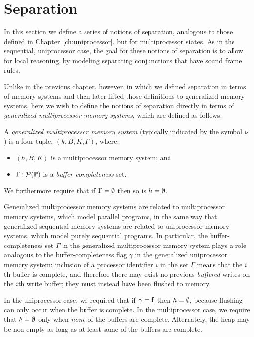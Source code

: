 \documentclass[11pt]{report}         %
\begin{document}
\section{Separation}
\label{sec:separation}

In this section we define a series of notions of separation, analogous to those defined in Chapter~\ref{ch:uniprocessor}, but for multiprocessor states. As in the sequential, uniprocessor case, the goal for these notions of separation is to allow for local reasoning, by modeling separating conjunctions that have sound frame rules. 

Unlike in the previous chapter, however, in which we defined separation in terms of memory systems and then later lifted those definitions to generalized memory systems, here we wish to define the notions of separation directly in terms of \emph{generalized multiprocessor memory systems}, which are defined as follows. 

\begin{definition}
  A \emph{generalized multiprocessor memory system} (typically indicated by the symbol $\nu$) is a four-tuple, $(h,B,K,\Gamma)$, where: 
  \begin{itemize}
    \item $(h,B,K)$ is a multiprocessor memory system; and 
    \item $\Gamma : \mathcal{P}(\mathbb{P})$ is a \emph{buffer-completeness} set. 
  \end{itemize} We furthermore require that if $\Gamma = \operatorname{\emptyset}$ then so is $h = \operatorname{\emptyset}$. 
\end{definition}

Generalized multiprocessor memory systems are related to multiprocessor memory systems, which model parallel programs, in the same way that generalized sequential memory systems are related to uniprocessor memory systems, which model purely sequential programs. In particular, the buffer-completeness set $\Gamma$ in the generalized multiprocessor memory system plays a role analogous to the buffer-completeness flag $\gamma$ in the generalized uniprocessor memory system: inclusion of a processor identifier $i$ in the set $\Gamma$ means that the $i$th buffer is complete, and therefore there may exist no previous \emph{buffered} writes on the $i$th write buffer; they must instead have been flushed to memory. 

In the uniprocessor case, we required that if $\gamma = \mathbf{f}$ then $h = \operatorname{\emptyset}$, because flushing can only occur when the buffer is complete. In the multiprocessor case, we require that $h = \operatorname{\emptyset}$ only when \emph{none} of the buffers are complete. Alternately, the heap may be non-empty as long as at least some of the buffers are complete. 
\end{document}
